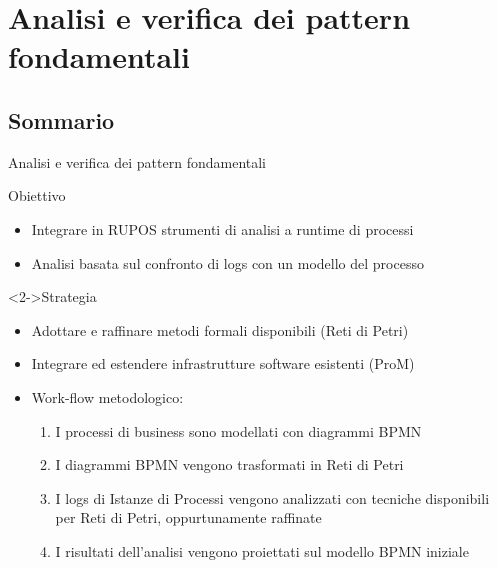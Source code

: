 \documentclass[10pt]{beamer}
\begin{document}
	
	\section{Analisi e verifica dei pattern fondamentali}
	\subsection{Sommario}
	\begin{frame}{ Analisi e verifica dei pattern fondamentali}
	  \begin{block}{Obiettivo}
	\begin{itemize}
	  \item Integrare in RUPOS strumenti di analisi a runtime di processi
	  \item  Analisi basata sul confronto di logs con un modello del processo
	\end{itemize}
	\end{block}
	
	  \begin{block}<2->{Strategia}
	    \begin{itemize}
	    \item Adottare e raffinare  metodi formali disponibili (Reti di Petri)
	    \item Integrare ed estendere infrastrutture software esistenti (ProM)
	    \item Work-flow metodologico:
	      \begin{enumerate}
	      \item I processi di business sono modellati con diagrammi BPMN
	      \item I diagrammi BPMN vengono trasformati in Reti di Petri
	      \item I logs di Istanze di Processi vengono analizzati con tecniche disponibili per Reti di Petri, oppurtunamente raffinate
	      \item I risultati dell'analisi vengono proiettati sul modello BPMN iniziale
	      \end{enumerate}
	    \end{itemize}
	
	  \end{block}
	\end{frame}
	
\end{document}
